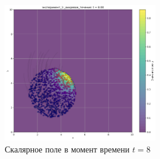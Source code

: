 \begin{figure}[h]
	\centering
	\includegraphics[width=0.6\textwidth]{imgs/lg/эксперимент_1:_вихревое_течение_t8.00.png}
	\caption{Скалярное поле в момент времени $t=8$ }
\end{figure}